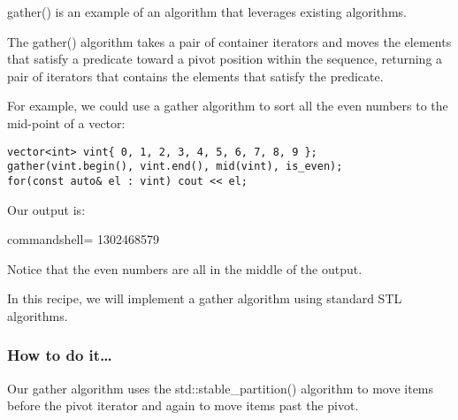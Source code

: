 
gather() is an example of an algorithm that leverages existing algorithms.

The gather() algorithm takes a pair of container iterators and moves the elements that satisfy a predicate toward a pivot position within the sequence, returning a pair of iterators that contains the elements that satisfy the predicate.

For example, we could use a gather algorithm to sort all the even numbers to the mid-point of a vector:

\begin{lstlisting}[style=styleCXX]
vector<int> vint{ 0, 1, 2, 3, 4, 5, 6, 7, 8, 9 };
gather(vint.begin(), vint.end(), mid(vint), is_even);
for(const auto& el : vint) cout << el;
\end{lstlisting}

Our output is:

\begin{tcblisting}{commandshell={}}
1302468579
\end{tcblisting}

Notice that the even numbers are all in the middle of the output.

In this recipe, we will implement a gather algorithm using standard STL algorithms.

\subsubsection{How to do it…}

Our gather algorithm uses the std::stable\_partition() algorithm to move items before the pivot iterator and again to move items past the pivot.

